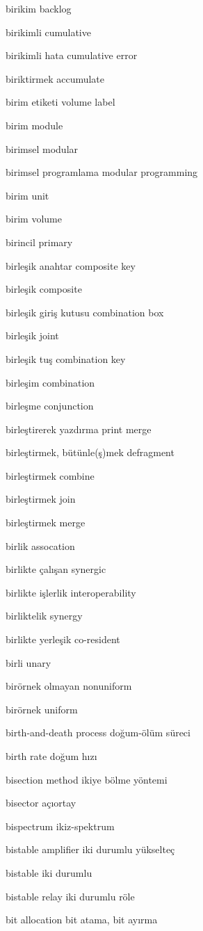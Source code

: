 \documentclass[12pt,fleqn]{article}\usepackage{../../common}
\begin{document}
birikim backlog

birikimli cumulative

birikimli hata cumulative error

biriktirmek accumulate

birim etiketi volume label

birim module

birimsel modular

birimsel programlama modular programming

birim unit

birim volume

birincil primary

birleşik anahtar composite key

birleşik composite

birleşik giriş kutusu combination box

birleşik joint

birleşik tuş combination key

birleşim combination

birleşme conjunction

birleştirerek yazdırma print merge

birleştirmek, bütünle(ş)mek defragment

birleştirmek combine

birleştirmek join

birleştirmek merge

birlik assocation

birlikte çalışan synergic

birlikte işlerlik interoperability

birliktelik synergy

birlikte yerleşik co-resident

birli unary

birörnek olmayan nonuniform

birörnek uniform

birth-and-death process doğum-ölüm süreci

birth rate doğum hızı

bisection method ikiye bölme yöntemi

bisector açıortay

bispectrum ikiz-spektrum

bistable amplifier iki durumlu yükselteç

bistable iki durumlu

bistable relay iki durumlu röle

bit allocation bit atama, bit ayırma
\end{document}
